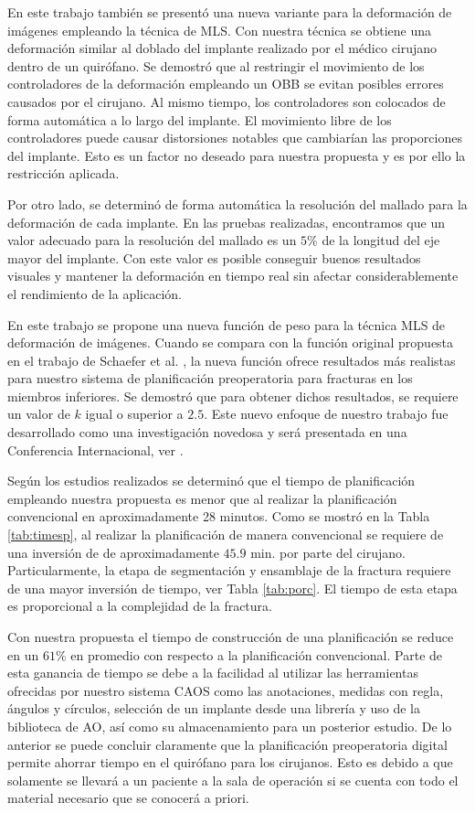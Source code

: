 En este trabajo tambi\'en se present\'o una nueva variante para la deformaci\'on de im\'agenes empleando la t\'ecnica de MLS. Con nuestra t\'ecnica se obtiene una deformaci\'on similar al doblado del implante realizado por el m\'edico cirujano dentro de un quir\'ofano. Se demostr\'o que al restringir el movimiento de los controladores de la deformaci\'on empleando un OBB se evitan posibles errores causados por el cirujano. Al mismo tiempo, los controladores son colocados de forma autom\'atica a lo largo del implante. El movimiento libre de los controladores puede causar distorsiones notables que cambiar\'ian las proporciones del implante. Esto es un factor no deseado para nuestra propuesta y es por ello la restricci\'on aplicada.

Por otro lado, se determin\'o de forma autom\'atica la resoluci\'on del mallado para la deformaci\'on de cada implante. En las pruebas realizadas, encontramos que un valor adecuado para la resoluci\'on del mallado es un $5\%$ de la longitud del eje mayor del implante. Con este valor es posible conseguir buenos resultados visuales y mantener la deformaci\'on en tiempo real sin afectar considerablemente el rendimiento de la aplicaci\'on.

En este trabajo se propone una nueva funci\'on de peso para la t\'ecnica MLS de deformaci\'on de im\'agenes. Cuando se compara con la funci\'on original propuesta en el trabajo de Schaefer et al. \cite{SCHAF06}, la nueva funci\'on ofrece resultados m\'as realistas para nuestro sistema de planificaci\'on preoperatoria para fracturas en los miembros inferiores. Se demostr\'o que para obtener dichos resultados, se requiere un valor de $k$ igual o superior a $2.5$. Este nuevo enfoque de nuestro trabajo fue desarrollado como una investigaci\'on novedosa y ser\'a presentada en una Conferencia Internacional, ver \cite{RAM11}. 

Seg\'un los estudios realizados se determin\'o que el tiempo de planificaci\'on empleando nuestra propuesta es menor que al realizar la planificaci\'on convencional en aproximadamente 28 minutos. Como se mostr\'o en la Tabla \ref{tab:timesp}, al realizar la planificaci\'on de manera convencional se requiere de una inversi\'on de de aproximadamente $45.9$ min. por parte del cirujano. Particularmente, la etapa de segmentaci\'on y ensamblaje de la fractura requiere de una mayor inversi\'on de tiempo, ver Tabla \ref{tab:porc}. El tiempo de esta etapa es proporcional a la complejidad de la fractura.

Con nuestra propuesta el tiempo de construcci\'on de una planificaci\'on se reduce en un $61\%$ en promedio con respecto a la planificaci\'on convencional. Parte de esta ganancia de tiempo se debe a la facilidad al utilizar las herramientas ofrecidas por nuestro sistema CAOS como las anotaciones, medidas con regla, \'angulos y c\'irculos, selecci\'on de un implante desde una librer\'ia y uso de la biblioteca de AO, as\'i como su almacenamiento para un posterior estudio. De lo anterior se puede concluir claramente que la planificaci\'on preoperatoria digital permite ahorrar tiempo en el quir\'ofano para los cirujanos. Esto es debido a que solamente se llevar\'a a un paciente a la sala de operaci\'on si se cuenta con todo el material necesario que se conocer\'a a priori.


